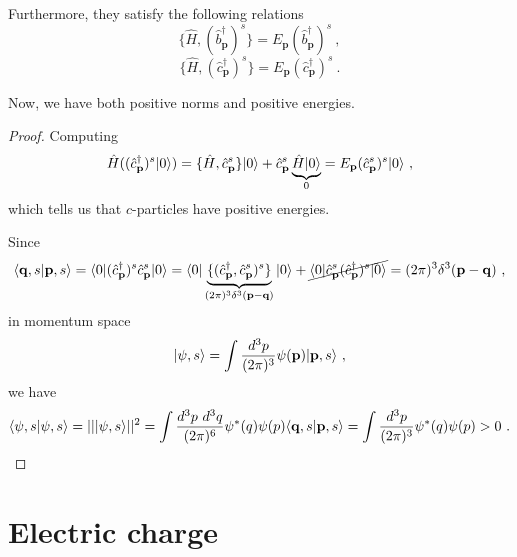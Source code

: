     Furthermore, they satisfy the following relations 
    \begin{equation*}
        \{\hat H, (\hat b^\dagger_{\mathbf p})^s\} = E_{\mathbf p} (\hat b^\dagger_{\mathbf p})^s ~,
    \end{equation*}
    \begin{equation*}
        \{\hat H, (\hat c^\dagger_{\mathbf p})^s\} = E_{\mathbf p} (\hat c^\dagger_{\mathbf p})^s ~.
    \end{equation*}

    Now, we have both positive norms and positive energies. 
    \begin{proof}
        Computing 
        \begin{equation*}
            \hat H ((\hat c^\dagger_{\mathbf p})^s \vert0\rangle) = \{\hat H, \hat c^s_{\mathbf p}\} \vert0\rangle + \hat c^s_{\mathbf p} \underbrace{\hat H \vert0\rangle}_0 = E_\mathbf p (\hat c^s_{\mathbf p})^s \vert0\rangle ~,
        \end{equation*}
        which tells us that $c$-particles have positive energies.

        Since
        \begin{equation*}
            \langle\mathbf q, s\vert\mathbf p, s\rangle = \langle0\vert (\hat c^\dagger_{\mathbf p})^s \hat c^s_{\mathbf p} \vert0\rangle = \langle0\vert \underbrace{\{(\hat c^\dagger_{\mathbf p} , \hat c^s_{\mathbf p})^s\}}_{(2\pi)^3 \delta^3 (\mathbf p - \mathbf q)} \vert0\rangle + \cancel{\langle0\vert \hat c^s_{\mathbf p} (\hat c^\dagger_{\mathbf p})^s \vert0\rangle} = (2\pi)^3 \delta^3 (\mathbf p - \mathbf q) ~,
        \end{equation*}
        in momentum space 
        \begin{equation*}
            \vert\psi, s\rangle = \int \frac{d^3 p}{(2\pi)^3} \psi (\mathbf p) \vert\mathbf p, s\rangle ~,
        \end{equation*}
        we have 
        \begin{equation*}
            \langle\psi, s\vert\psi, s\rangle = ||\vert\psi, s\rangle||^2 = \int \frac{d^3 p ~ d^3 q}{(2\pi)^6} \psi^* \mathbf(q) \psi \mathbf(p) \langle\mathbf q, s\vert\mathbf p, s\rangle = \int \frac{d^3 p}{(2\pi)^3} \psi^* \mathbf(q) \psi \mathbf(p) > 0 ~.
        \end{equation*}
    \end{proof}

\section{Electric charge}

